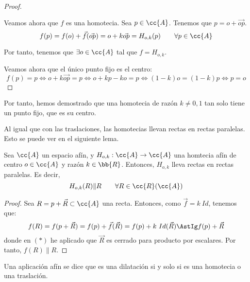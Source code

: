 \begin{proof}
\begin{description}
        Veamos ahora que $f$ es una homotecia. Sea $p\in \cc{A}$. Tenemos que $p=o+\vec{op}$.
        \begin{equation*}
            f(p) = f(o)+\vec{f}(\vec{op}) = o+k\vec{op} = H_{o,k}(p) \qquad \forall p\in \cc{A}
        \end{equation*}

        Por tanto, tenemos que $\exists o\in \cc{A}$ tal que $f=H_{o,k}$.
    \end{description}\vspace{1cm}
    
    Veamos ahora que el único punto fijo es el centro:
    \begin{equation*}
        f(p)=p \Longleftrightarrow o+k\vec{op} = p \Longleftrightarrow o+kp-ko = p \Longleftrightarrow (1-k)o = (1-k)p \Longleftrightarrow p=o
    \end{equation*}
\end{proof}
Por tanto, hemos demostrado que una homotecia de razón $k\neq 0,1$ tan solo tiene un punto fijo, que es su centro.

Al igual que con las traslaciones, las homotecias llevan rectas en rectas paralelas. Esto se puede ver en el siguiente lema.
\begin{lema}
    Sea $\cc{A}$ un espacio afín, y $H_{o,k}:\cc{A}\to \cc{A}$ una homtecia afín de centro $o\in \cc{A}$ y razón $k\in \bb{R}$. Entonces, $H_{o,k}$ lleva rectas en rectas paralelas. Es decir,
    \begin{equation*}
        H_{o,k}(R)\| R \qquad \forall R\in \cc{R}(\cc{A})
    \end{equation*}
\end{lema}
\begin{proof}
    Sea $R=p+\vec{R}\subset \cc{A}$ una recta. Entonces, como $\vec{f}=k~Id$, tenemos que:
    \begin{equation*}
        f(R) = f(p+\vec{R}) = f(p) + \vec{f}(\vec{R}) = f(p) + k~Id(\vec{R}) \AstIg f(p) + \vec{R}
    \end{equation*}
    donde en $(\ast)$ he aplicado que $\vec{R}$ es cerrado para producto por escalares. Por tanto, $f(R)\| R$.
\end{proof}

\begin{definicion}
    Una aplicación afín se dice que es una dilatación si y solo si es una homotecia o una traslación.
\end{definicion}

